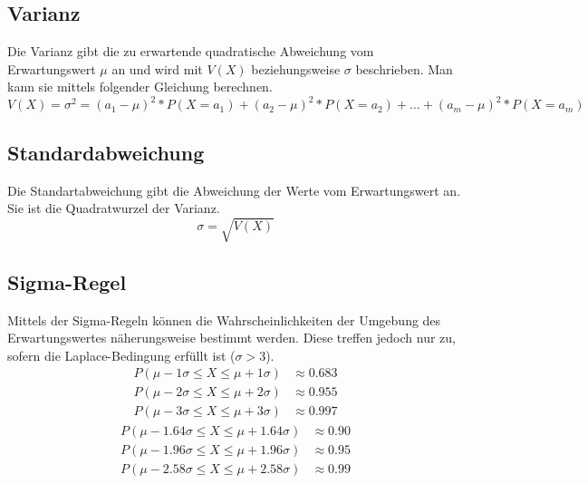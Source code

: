 \documentclass[a4paper]{article}
\begin{document}
		\subsection{Varianz}
			Die Varianz gibt die zu erwartende quadratische Abweichung vom Erwartungswert $\mu$ an und wird mit $V\left(X\right)$ beziehungsweise $\sigma$ beschrieben. Man kann sie mittels folgender Gleichung berechnen.
			\begin{equation}
				V(X) = \sigma^2 = (a_1 - \mu)^2 * P(X = a_1) + (a_2 - \mu)^2 * P(X = a_2) + \dotsc + (a_m - \mu)^2 * P(X = a_m)
			\end{equation}
		\subsection{Standardabweichung}
			Die Standartabweichung gibt die Abweichung der Werte vom Erwartungswert an. Sie ist die Quadratwurzel der Varianz.
			\begin{equation}
				\sigma = \sqrt{V(X)}
			\end{equation}
		\subsection{Sigma-Regel}
			Mittels der Sigma-Regeln können die Wahrscheinlichkeiten der Umgebung des Erwartungswertes näherungsweise bestimmt werden. Diese treffen jedoch nur zu, sofern die Laplace-Bedingung erfüllt ist ($\sigma > 3$).
			\begin{subequations}
				\begin{align}
					P(\mu - 1\sigma \leq X \leq \mu + 1\sigma) &\approx 0.683\\
					P(\mu - 2\sigma \leq X \leq \mu + 2\sigma) &\approx 0.955\\
					P(\mu - 3\sigma \leq X \leq \mu + 3\sigma) &\approx 0.997
				\end{align}
			\end{subequations}
			\begin{subequations}
				\begin{align}
				P(\mu - 1.64\sigma \leq X \leq \mu + 1.64\sigma) &\approx 0.90\\
				P(\mu - 1.96\sigma \leq X \leq \mu + 1.96\sigma) &\approx 0.95\\
				P(\mu - 2.58\sigma \leq X \leq \mu + 2.58\sigma) &\approx 0.99
				\end{align}
			\end{subequations}
			
\end{document}
